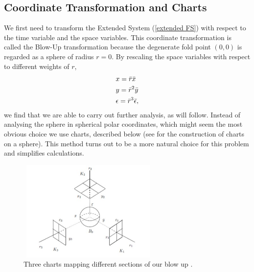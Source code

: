 \subsection{Coordinate Transformation and Charts} \label{sec:transform blowup}
We first need to transform the Extended System (\ref{extended FS}) with respect to the time variable and the space variables. This coordinate transformation is called the Blow-Up transformation because the degenerate fold point $(0,0)$ is regarded as a sphere of radius $r=0$. By rescaling the space variables with respect to different weights of $r$,\begin{subequations}
    \begin{align}
        &x=\Bar{r}\Bar{x}  \label{sys: blow up trans x}\\
        &y=\Bar{r}^2\Bar{y} \label{sys: blow up trans y}\\ 
        &\epsilon=\bar{r}^3\bar{\epsilon} \label{sys: blow up trans z},
    \end{align}  
    \label{sys: blow up trans}
\end{subequations} we find that we are able to carry out further analysis, as will follow.
Instead of analysing the sphere in spherical polar coordinates, which might seem the most obvious choice we use charts, described below (see \citet{needam} for the construction of charts on a sphere). This method turns out to be a more natural choice for this problem and simplifies calculations.
\begin{figure}[h!]
	\centering
	\includegraphics[height=5cm,width=7cm]{Images/charts-ball}
	\caption{Three charts mapping different sections of our blow up \citep{krupa2001}.}
	\label{fig:chartDiagram}
\end{figure}

